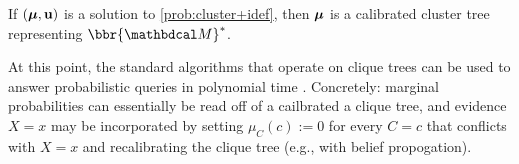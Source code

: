 \documentclass[twoside]{article}
\newcommand\obslimit{observational facet} %
\begin{document}
\begin{prop} \label{prop:cluster+idef}
    If $(\boldsymbol\mu, \mathbf{u})$ is a solution to \eqref{prob:cluster+idef},
    then $\boldsymbol\mu$ is a calibrated cluster tree representing
    $\bbr{\dg M}^*$.
\end{prop}

At this point, the standard algorithms that operate on
clique trees
can be used to answer probabilistic queries in polynomial time \parencite[\S 10.3.3]{koller2009probabilistic}.
Concretely: marginal probabilities can essentially be read off of a cailbrated a clique tree,
and evidence $X{=}x$ may be incorporated by
setting $\mu_C(c) := 0$ for every $C{=}c$ that conflicts with $X{=}x$
and recalibrating the clique tree (e.g., with belief propogation).
%
\end{document}
